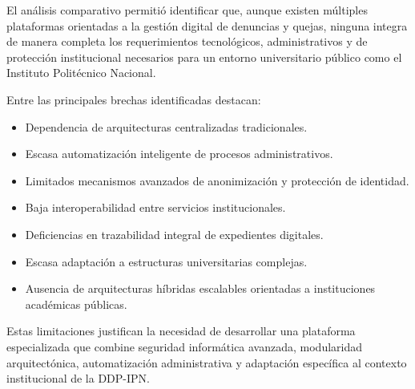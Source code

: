 \begin{flushleft}
\justifying

El análisis comparativo permitió identificar que, aunque existen múltiples plataformas orientadas a la gestión digital de denuncias y quejas, ninguna integra de manera completa los requerimientos tecnológicos, administrativos y de protección institucional necesarios para un entorno universitario público como el Instituto Politécnico Nacional.

Entre las principales brechas identificadas destacan:

\begin{itemize}

    \item Dependencia de arquitecturas centralizadas tradicionales.
    
    \item Escasa automatización inteligente de procesos administrativos.
    
    \item Limitados mecanismos avanzados de anonimización y protección de identidad.
    
    \item Baja interoperabilidad entre servicios institucionales.
    
    \item Deficiencias en trazabilidad integral de expedientes digitales.
    
    \item Escasa adaptación a estructuras universitarias complejas.
    
    \item Ausencia de arquitecturas híbridas escalables orientadas a instituciones académicas públicas.

\end{itemize}

Estas limitaciones justifican la necesidad de desarrollar una plataforma especializada que combine seguridad informática avanzada, modularidad arquitectónica, automatización administrativa y adaptación específica al contexto institucional de la DDP-IPN.

\end{flushleft}